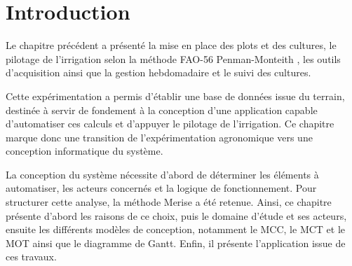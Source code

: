 \section{Introduction}
Le chapitre précédent a présenté la mise en place des plots et des cultures, le pilotage de l'irrigation selon la méthode FAO-56 Penman-Monteith \cite{allen_crop_1998-1}, les outils d'acquisition ainsi que la gestion hebdomadaire et le suivi des cultures. 

Cette expérimentation a permis d'établir une base de données issue du terrain, destinée à servir de fondement à la conception d’une application capable d’automatiser ces calculs et d’appuyer le pilotage de l’irrigation. 
Ce chapitre marque donc une transition de l'expérimentation agronomique vers une conception informatique du système.

La conception du système nécessite d’abord de déterminer les éléments à automatiser, les acteurs concernés et la logique de fonctionnement. 
Pour structurer cette analyse, la méthode Merise a été retenue. Ainsi, ce chapitre présente d’abord les raisons de ce choix, puis le domaine d'étude et ses acteurs, ensuite les différents modèles de conception, notamment le MCC, le MCT et le MOT ainsi que le diagramme de Gantt. Enfin, il présente l’application issue de ces travaux.
